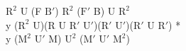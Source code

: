 $\text{R}^2$ U (F $\text{B}'$) $\text{R}^2$ ($\text{F}'$ B) U $\text{R}^2$\\
y ($\text{R}^2$ U)(R U $\text{R}'$ $\text{U}'$)($\text{R}'$ $\text{U}'$)($\text{R}'$ U $\text{R}'$) *\\
y ($\text{M}^2$ $\text{U}'$ M) $\text{U}^2$ ($\text{M}'$ $\text{U}'$ $\text{M}^2$)\\

